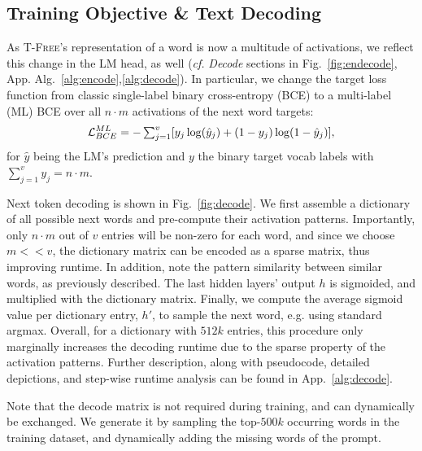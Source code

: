 \documentclass[11pt]{article}
\newcommand{\method}{\textsc{T-Free}}
\begin{document}
\subsection{Training Objective \& Text Decoding}

As \method's representation of a word is now a multitude of activations, we reflect this change in the LM head, as well (\emph{cf.} \textit{Decode} sections in Fig.~\ref{fig:endecode}, App. Alg.~\ref{alg:encode},\ref{alg:decode}).
In particular, we change the target loss function from classic single-label binary cross-entropy (BCE) to a multi-label (ML) BCE over all $n\cdot m$ activations of the next word targets: 
\begin{equation*}
\small\mathcal{L}^{ML}_{BCE} \small\textstyle = - \sum_{j=1}^{v} [y_{j} \log(\hat{y}_{j}) + (1-y_j)\log(1-\hat{y}_{j})],
\end{equation*}
for $\hat{y}$ being the LM's prediction and  $y$ the binary  target vocab labels with $\sum_{j=1}^{v} y_j  =  n\cdot m$.

Next token decoding is shown in Fig.~\ref{fig:decode}. We first assemble a dictionary of all possible next words and pre-compute their activation patterns.  
Importantly, only $n\cdot m$ out of $v$ entries will be non-zero for each word, and since we choose $m <\!< v$, the dictionary matrix can be encoded as a sparse matrix, thus improving runtime.
In addition, note the pattern similarity between similar words, as previously described.
The last hidden layers' output $h$ is sigmoided, and multiplied with the dictionary matrix.
Finally, we compute the average sigmoid value per dictionary entry, $h'$, to sample the next word, e.g. using standard argmax. Overall, for a dictionary with $512k$ entries, this procedure only marginally increases the decoding runtime due to the sparse property of the activation patterns. Further description, along with pseudocode, detailed depictions, and step-wise runtime analysis can be found in App.~\ref{alg:decode}. 

Note that the decode matrix is not required during training, and can dynamically be exchanged. We generate it by sampling the top-$500k$ occurring words in the training dataset, and dynamically adding the missing words of the prompt. 
\end{document}
